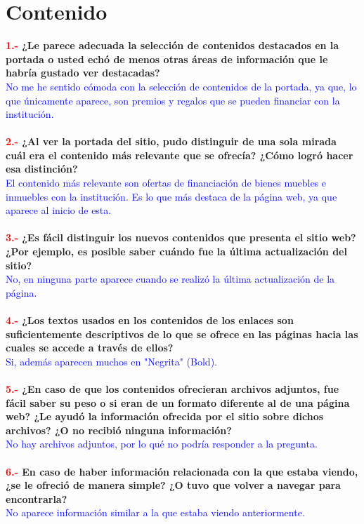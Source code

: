 \documentclass[openany,overnay,a4paper, twoside, 14pt]{book}
\begin{document}
\chapter*{Contenido}
\textbf{\textcolor{red}{1.-} ¿Le parece adecuada la selección de contenidos destacados en la portada o usted echó de menos otras áreas de información que le habría gustado ver destacadas?}\\
\textcolor{blue}{No me he sentido cómoda con la selección de contenidos de la portada, ya que, lo que únicamente aparece, son premios y regalos que se pueden financiar con la institución.}\\
\\
\textbf{\textcolor{red}{2.-} ¿Al ver la portada del sitio, pudo distinguir de una sola mirada cuál era el contenido más relevante que se ofrecía? ¿Cómo logró hacer esa distinción? }\\
\textcolor{blue}{El contenido más relevante son ofertas de financiación de bienes muebles e inmuebles con la institución. Es lo que más destaca de la página web, ya que aparece al inicio de esta.}\\
\\
\textbf{\textcolor{red}{3.-} ¿Es fácil distinguir los nuevos contenidos que presenta el sitio web? ¿Por ejemplo, es posible saber cuándo fue la última actualización del sitio?}\\
\textcolor{blue}{No, en ninguna parte aparece cuando se realizó la última actualización de la página.}\\
\\
\textbf{\textcolor{red}{4.-} ¿Los textos usados en los contenidos de los enlaces son suficientemente descriptivos de lo que se ofrece en las páginas hacia las cuales se accede a través de ellos?}\\
\textcolor{blue}{Si, además aparecen muchos en "Negrita" (Bold).}\\
\\
\textbf{\textcolor{red}{5.-} ¿En caso de que los contenidos ofrecieran archivos adjuntos, fue fácil saber su peso o si eran de un formato diferente al de una página web? ¿Le ayudó la información ofrecida por el sitio sobre dichos archivos? ¿O no recibió ninguna información? }\\
\textcolor{blue}{No hay archivos adjuntos, por lo qué no podría responder a la pregunta.}\\
\\
\textbf{\textcolor{red}{6.-} En caso de haber información relacionada con la que estaba viendo, ¿se le ofreció de manera simple? ¿O tuvo que volver a navegar para encontrarla?}\\
\textcolor{blue}{No aparece información similar a la que estaba viendo anteriormente.}\\
\end{document}
